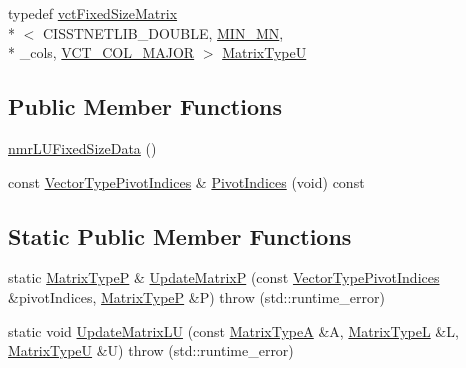 \begin{DoxyCompactItemize}
\item 
typedef \hyperlink{classvct_fixed_size_matrix}{vct\-Fixed\-Size\-Matrix}\\*
$<$ C\-I\-S\-S\-T\-N\-E\-T\-L\-I\-B\-\_\-\-D\-O\-U\-B\-L\-E, \hyperlink{classnmr_l_u_fixed_size_data_a711189aba194fb9e0854b1058f1e527aaa5d1ce549243ebe74888a9a9ede21944}{M\-I\-N\-\_\-\-M\-N}, \\*
\-\_\-cols, \hyperlink{vct_forward_declarations_8h_a432cdf8923afaf82f551450ad4034746}{V\-C\-T\-\_\-\-C\-O\-L\-\_\-\-M\-A\-J\-O\-R} $>$ \hyperlink{classnmr_l_u_fixed_size_data_af66a67d9ec3e76d9d63dc36cfd969896}{Matrix\-Type\-U}
\end{DoxyCompactItemize}
\subsection*{Public Member Functions}
\begin{DoxyCompactItemize}
\item 
\hyperlink{classnmr_l_u_fixed_size_data_a53d700280dd2663d45686bfae5fa0867}{nmr\-L\-U\-Fixed\-Size\-Data} ()
\item 
const \hyperlink{classnmr_l_u_fixed_size_data_aa44bd56146e161d7b56d7f2001153ccb}{Vector\-Type\-Pivot\-Indices} \& \hyperlink{classnmr_l_u_fixed_size_data_a450ee8a4007ec135b10d3885252f10ad}{Pivot\-Indices} (void) const 
\end{DoxyCompactItemize}
\subsection*{Static Public Member Functions}
\begin{DoxyCompactItemize}
\item 
static \hyperlink{classnmr_l_u_fixed_size_data_aba187a86e2a881d8327e56bdbc87b159}{Matrix\-Type\-P} \& \hyperlink{classnmr_l_u_fixed_size_data_a5d947401ed17aa37b22c32b21635351f}{Update\-Matrix\-P} (const \hyperlink{classnmr_l_u_fixed_size_data_aa44bd56146e161d7b56d7f2001153ccb}{Vector\-Type\-Pivot\-Indices} \&pivot\-Indices, \hyperlink{classnmr_l_u_fixed_size_data_aba187a86e2a881d8327e56bdbc87b159}{Matrix\-Type\-P} \&P)  throw (std\-::runtime\-\_\-error)
\item 
static void \hyperlink{classnmr_l_u_fixed_size_data_a3f656dde277e1d9841a9a21270e13861}{Update\-Matrix\-L\-U} (const \hyperlink{classnmr_l_u_fixed_size_data_aecd74a0eb81f7dae537d4cce15781210}{Matrix\-Type\-A} \&A, \hyperlink{classnmr_l_u_fixed_size_data_a6bf3bc7a9257ec14a9a47f6144fdbb4c}{Matrix\-Type\-L} \&L, \hyperlink{classnmr_l_u_fixed_size_data_af66a67d9ec3e76d9d63dc36cfd969896}{Matrix\-Type\-U} \&U)  throw (std\-::runtime\-\_\-error)
\end{DoxyCompactItemize}
